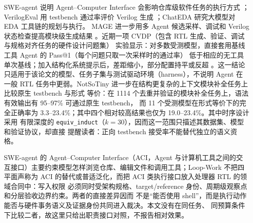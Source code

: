 \documentclass[UTF8,a4paper,zihao=-4,oneside]{ctexart}
\begin{document}
SWE-agent 说明 Agent--Computer Interface 会影响仓库级软件任务的执行方式
\cite{yang2024sweagent}；VerilogEval 用 testbench 通过率评价 Verilog 生成
\cite{liu2023verilogeval}；ChatEDA 研究大模型对 EDA 工具链的规划与执行\cite{wu2024chateda}。
MAGE 进一步用多 Agent 候选采样、调试和 Verilog 状态检查提高模块级生成结果
\cite{zhao2025mage}。近期一项 CVDP（包含 RTL 生成、验证、调试与规格对齐任务的硬件设计问题集）
实验显示：对多数受测模型，直接套用基线工具 Agent 的 Pass@1（每个问题只取一次采样时的通过率）
低于相应的无工具单次基线；加入结构化系统提示后，差距缩小，部分配置持平或反超
\cite{yubeaton2026agentic}。这一结论只适用于该论文的模型、任务子集与测试驱动环境（harness），不说明 Agent 在一般
RTL 任务中更弱。NotSoTiny 进一步在结构更复杂的上下文模块补全任务上比较原生 testbench 与形式
等价：在 1114 个去重并验证的模块补全任务上，语法有效输出有 95--97\% 可通过原生 testbench，
而 11 个受测模型在形式等价下的完全正确率为 3.3--23.4\%；其中四个相对较高结果也仅为
19.0--23.4\%\cite{ghorab2025notsotiny}。其中时序设计采用
有限深度的 \texttt{equiv\_induct}（$k=30$），因而这一范围只描述其数据集、模型和验证协议，却直接
提醒读者：正向
testbench 接受率不能替代独立的语义资格。

SWE-agent 的 Agent--Computer Interface（ACI，Agent 与计算机工具之间的交互接口）主要约束模型怎样浏览仓库、编辑文件和调用工具；Loop-Work
不把四平面声称为 ACI 的替代或普适泛化，而把 ACI 类执行接口放入处理器 RTL 的领域合同中：写入权限
必须同时受架构规格、target/reference 身份、周期级观察点和分层验收边界约束。两者的直接差异因而
不是“能否使用 shell”，而是执行动作能否与硬件事务语义及证据身份共同进入裁决。本文没有在同任务、
同预算条件下比较二者，故这里只给出职责接口对照，不报告相对效果。
\end{document}

